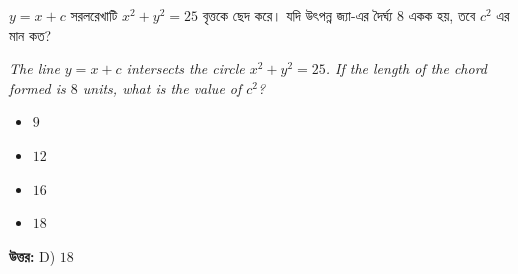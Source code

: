 \documentclass[12pt, a4paper]{article}
\begin{document}
\begin{tcolorbox}[questionbox={প্রশ্ন (Question) 13}]
    \noindent
    $y = x + c$ সরলরেখাটি $x^2 + y^2 = 25$ বৃত্তকে ছেদ করে। যদি উৎপন্ন জ্যা-এর দৈর্ঘ্য $8$ একক হয়, তবে $c^2$ এর মান কত?
    
    \vspace{0.8em}
    \begin{english}
    \noindent\textit{\color{darkgray}
    The line $y = x + c$ intersects the circle $x^2 + y^2 = 25$. If the length of the chord formed is $8$ units, what is the value of $c^2$?
    }
    \end{english}
\end{tcolorbox}

\begin{itemize}[label={}, leftmargin=1cm, itemsep=0.5em]
    \item[\textbf{A)}] $9$
    \item[\textbf{B)}] $12$
    \item[\textbf{C)}] $16$
    \item[\textbf{D)}] $18$
\end{itemize}

\vspace{0.5em}
\begin{tcolorbox}[answerbox]
    \textbf{\color{success} উত্তর:} D) $18$
\end{tcolorbox}
\vspace{1em}
\end{document}

